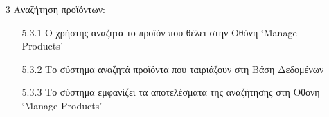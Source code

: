 \documentclass[12pt,a4paper,twoside]{book}
\begin{document}
\begin{enumerate}
  \item[3 ] Αναζήτηση προϊόντων:
        \begin{enumerate}
          \item[5.3.1 ] Ο χρήστης αναζητά το προϊόν που θέλει στην Οθόνη `Manage Products' %
          \item[5.3.2 ] Το σύστημα αναζητά προϊόντα που ταιριάζουν στη Βάση Δεδομένων %
          \item[5.3.3 ] Το σύστημα εμφανίζει τα αποτελέσματα της αναζήτησης στη Οθόνη `Manage Products' %
        \end{enumerate}

\end{enumerate}
\end{document}
